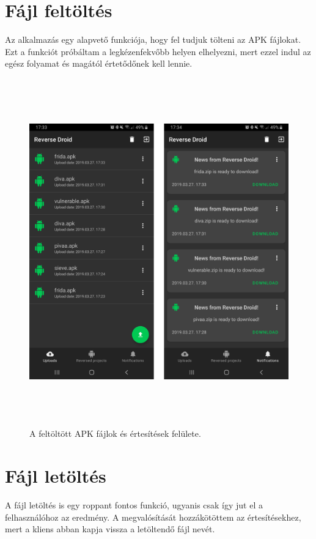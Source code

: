 \documentclass{thesis-ekf}
\theoremstyle{definition}
\theoremstyle{remark}
\begin{document}
\section{Fájl feltöltés}

Az alkalmazás egy alapvető funkciója, hogy fel tudjuk tölteni az APK fájlokat.
Ezt a funkciót próbáltam a legkézenfekvőbb helyen elhelyezni, mert ezzel indul az egész folyamat és magától értetődőnek kell lennie.

\begin{figure}[!h]
	\centering
	\includegraphics[height=15cm]{pictures/android_uploads_notifications}
	\caption{A feltöltött APK fájlok és értesítések felülete.}
	\label{login}
\end{figure}

\section{Fájl letöltés}

A fájl letöltés is egy roppant fontos funkció, ugyanis csak így jut el a felhasználóhoz az eredmény.
A megvalósítását hozzákötöttem az értesítésekhez, mert a kliens abban kapja vissza a letöltendő fájl nevét.
\end{document}
